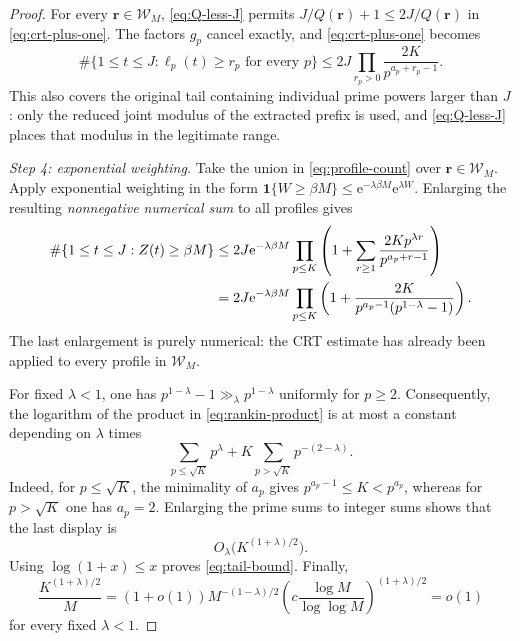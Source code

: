 \documentclass[10pt,a4paper]{amsart}
\newcommand{\e}{\mathrm e}
\newcommand{\ind}{\mathbf 1}
\begin{document}
\begin{proof}
For every \(\mathbf r\in\mathcal W_M\), \eqref{eq:Q-less-J} permits
\(J/Q(\mathbf r)+1\leq2J/Q(\mathbf r)\) in
\eqref{eq:crt-plus-one}.  The factors
\(g_p\) cancel exactly, and \eqref{eq:crt-plus-one} becomes
\begin{equation}\label{eq:profile-count}
 \#\{1\leq t\leq J:\ell_p(t)\geq r_p\text{ for every }p\}
 \leq
 2J\prod_{r_p>0}\frac{2K}{p^{a_p+r_p-1}}.
\end{equation}
This also covers the original tail containing individual prime powers larger
than \(J\): only the reduced joint modulus of the extracted prefix is used,
and \eqref{eq:Q-less-J} places that modulus in the legitimate range.

\medskip
\noindent\emph{Step 4: exponential weighting.}
Take the union in \eqref{eq:profile-count} over
\(\mathbf r\in\mathcal W_M\).  Apply exponential weighting in the form
\(\ind\{W\geq\beta M\}\leq
\e^{-\lambda\beta M}\e^{\lambda W}\).  Enlarging the resulting
\emph{nonnegative numerical sum} to all profiles gives
\begin{align}
 \#\{1\leq t\leq J:Z(t)\geq\beta M\}
 &\leq2J\e^{-\lambda\beta M}
 \prod_{p\leq K}
 \left(1+\sum_{r\geq1}
   \frac{2Kp^{\lambda r}}{p^{a_p+r-1}}\right)\notag\\
 &=2J\e^{-\lambda\beta M}
 \prod_{p\leq K}
 \left(1+
   \frac{2K}{p^{a_p-1}(p^{1-\lambda}-1)}\right).
 \label{eq:rankin-product}
\end{align}
The last enlargement is purely numerical: the CRT estimate has already been
applied to every profile in \(\mathcal W_M\).

For fixed \(\lambda<1\), one has
\(p^{1-\lambda}-1\gg_\lambda p^{1-\lambda}\) uniformly for \(p\geq2\).
Consequently, the logarithm of the product in
\eqref{eq:rankin-product} is at most a constant depending on \(\lambda\)
times
\[
 \sum_{p\leq\sqrt K}p^\lambda
 +K\sum_{p>\sqrt K}p^{-(2-\lambda)}.
\]
Indeed, for \(p\leq\sqrt K\), the minimality of \(a_p\) gives
\(p^{a_p-1}\leq K<p^{a_p}\), whereas for \(p>\sqrt K\) one has
\(a_p=2\).  Enlarging the prime sums to integer sums shows that the last
display is
\begin{equation}\label{eq:euler-error}
 O_\lambda\bigl(K^{(1+\lambda)/2}\bigr).
\end{equation}
Using \(\log(1+x)\leq x\) proves \eqref{eq:tail-bound}.
Finally,
\[
 \frac{K^{(1+\lambda)/2}}M
 =(1+o(1))M^{-(1-\lambda)/2}
  \left(c\frac{\log M}{\log\log M}\right)^{(1+\lambda)/2}
 =o(1)
\]
for every fixed \(\lambda<1\).
\end{proof}
\end{document}
